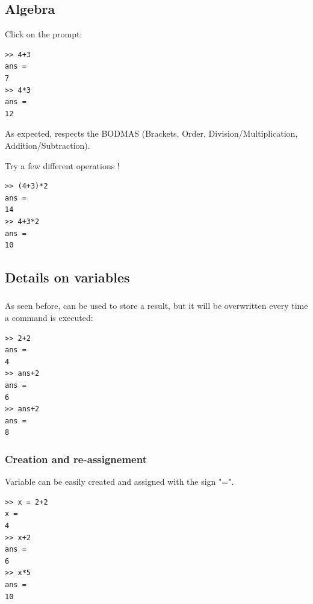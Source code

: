 	\subsection{Algebra}
		Click on the prompt: 
\begin{lstlisting}
>> 4+3
ans =
7
>> 4*3
ans =
12
\end{lstlisting}
		As expected, \matlab respects the BODMAS (Brackets, Order, Division/Multiplication, Addition/Subtraction). 

		Try a few different operations !
\begin{lstlisting}
>> (4+3)*2
ans =
14
>> 4+3*2
ans =
10
\end{lstlisting}

	\subsection{Details on variables}
		\subsubsection{}
			As seen before,  can be used to store a result, but it will be overwritten every time a command is executed:
\begin{lstlisting}
>> 2+2
ans =
4
>> ans+2
ans =
6
>> ans+2
ans =
8
\end{lstlisting}

		\subsubsection{Creation and re-assignement}
			Variable can be easily created and assigned with the sign "=". 
\begin{lstlisting}
>> x = 2+2
x =
4
>> x+2
ans =
6
>> x*5
ans =
10
\end{lstlisting}

